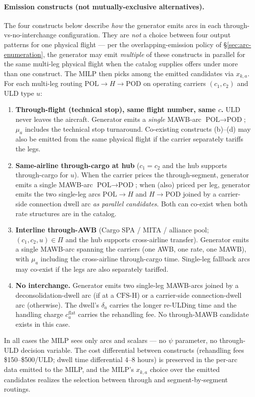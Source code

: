 \documentclass[11pt,a4paper]{article}
\theoremstyle{definition}
\begin{document}
\paragraph{Emission constructs (not mutually-exclusive alternatives).}
The four constructs below describe \emph{how} the generator emits arcs in
each through-vs-no-interchange configuration. They are \emph{not} a choice
between four output patterns for one physical flight --- per the
overlapping-emission policy of \S\ref{sec:arc-enumeration}, the generator
may emit \emph{multiple} of these constructs in parallel for the same
multi-leg physical flight when the catalog supplies offers under more than
one construct. The MILP then picks among the emitted candidates via
$x_{k, a}$. For each multi-leg routing $\text{POL} \to H \to \text{POD}$ on
operating carriers $(c_1, c_2)$ and ULD type $u$:
\begin{enumerate}[noitemsep,label=(\alph*)]
  \item \textbf{Through-flight (technical stop), same flight number, same
        $c$.} ULD never leaves the aircraft. Generator emits a
        \emph{single} MAWB-arc $\text{POL} \to \text{POD}$; $\mu_a$
        includes the technical stop turnaround. Co-existing constructs
        (b)--(d) may also be emitted from the same physical flight if the
        carrier separately tariffs the legs.
  \item \textbf{Same-airline through-cargo at hub} ($c_1 = c_2$ and the
        hub supports through-cargo for $u$). When the carrier prices the
        through-segment, generator emits a single MAWB-arc $\text{POL} \to
        \text{POD}$; when (also) priced per leg, generator emits the two
        single-leg arcs $\text{POL} \to H$ and $H \to \text{POD}$ joined
        by a carrier-side connection dwell arc \emph{as parallel
        candidates}. Both can co-exist when both rate structures are in
        the catalog.
  \item \textbf{Interline through-AWB} (Cargo SPA / MITA / alliance pool;
        $(c_1, c_2, u) \in \Pi$ and the hub supports cross-airline
        transfer). Generator emits a single MAWB-arc spanning the
        carriers (one AWB, one rate, one MAWB), with $\mu_a$ including
        the cross-airline through-cargo time. Single-leg fallback arcs
        may co-exist if the legs are also separately tariffed.
  \item \textbf{No interchange.} Generator emits two single-leg MAWB-arcs
        joined by a deconsolidation-dwell arc (if at a $\text{CFS-H}$) or
        a carrier-side connection-dwell arc (otherwise). The dwell's
        $\delta_a$ carries the longer re-ULDing time and the handling
        charge $c_a^{\text{flat}}$ carries the rehandling fee. No
        through-MAWB candidate exists in this case.
\end{enumerate}
In all cases the MILP sees only arcs and scalars --- no $\psi$ parameter,
no through-ULD decision variable. The cost differential between
constructs (rehandling fees \$150--\$500/ULD; dwell time differential
4--8 hours) is preserved in the per-arc data emitted to the MILP, and the
MILP's $x_{k, a}$ choice over the emitted candidates realizes the
selection between through and segment-by-segment routings.
\end{document}
